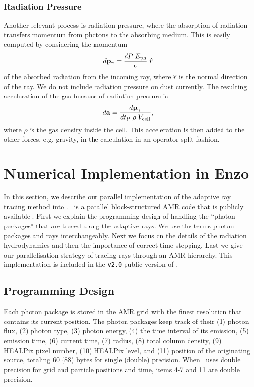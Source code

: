 \documentclass[useAMS,usenatbib]{mn2e}
\begin{document}
\subsubsection{Radiation Pressure}

Another relevant process is radiation pressure, where the absorption
of radiation transfers momentum from photons to the absorbing medium.
This is easily computed by considering the momentum
\begin{equation}
  \label{eqn:radpres}
  d\mathbf{p}_\gamma = \frac{dP \; E_{\rm ph}}{c} \; \hat{r}
\end{equation}
of the absorbed radiation from the incoming ray, where $\hat{r}$ is
the normal direction of the ray.  We do not include radiation pressure
on dust currently.  The resulting acceleration of the gas because of
radiation pressure is
\begin{equation}
  d\mathbf{a} = \frac{d\mathbf{p}_\gamma} {dt_P\; \rho \; V_{\rm cell}},
\end{equation}
where $\rho$ is the gas density inside the cell.  This acceleration is
then added to the other forces, e.g. gravity, in the calculation in an
operator split fashion.

\section{Numerical Implementation in Enzo}
\label{sec:numerical}

In this section, we describe our parallel implementation of the
adaptive ray tracing method into \enzo.  \enzo~is a parallel
block-structured AMR \citep{BergerAMR} code that is publicly available
\citep{BryanNorman1997, OShea2004}.  First we explain the programming
design of handling the ``photon packages'' that are traced along the
adaptive rays.  We use the terms photon packages and rays
interchangeably.  Next we focus on the details of the radiation
hydrodynamics and then the importance of correct time-stepping.  Last
we give our parallelisation strategy of tracing rays through an AMR
hierarchy.  This implementation is included in the \texttt{v2.0}
public version of \enzo.

\subsection{Programming Design}
\label{sec:design}

Each photon package is stored in the AMR grid with the finest
resolution that contains its current position.  The photon packages
keep track of their (1) photon flux, (2) photon type, (3) photon
energy, (4) the time interval of its emission, (5) emission time, (6)
current time, (7) radius, (8) total column density, (9) HEALPix pixel
number, (10) HEALPix level, and (11) position of the originating
source, totaling 60 (88) bytes for single (double) precision.  When
\enzo~uses double precision for grid and particle positions and time,
items 4-7 and 11 are double precision.
\end{document}
